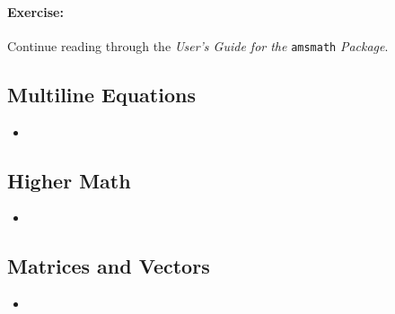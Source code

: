 		\paragraph{Exercise:}Continue reading through the \textit{User's Guide for the }\texttt{amsmath} \textit{Package}.

        \subsection{Multiline Equations}
        \label{Multiline Equations}
        
        \begin{framed}
            \begin{itemize}
                \item{}
            \end{itemize}
        \end{framed}

        \subsection{Higher Math}
        \label{Higher Math}
        
        \begin{framed}
            \begin{itemize}
                \item{}
            \end{itemize}
        \end{framed}

        \subsection{Matrices and Vectors}
        \label{Matrices and Vectors}
        
        \begin{framed}
            \begin{itemize}
                \item{}
            \end{itemize}
        \end{framed}


